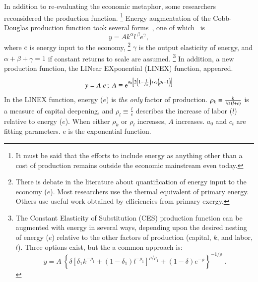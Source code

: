 In addition to re-evaluating the economic metaphor,
some researchers reconsidered the production function.%
	\footnote{
	It must be said that the efforts to include energy 
	as anything other than a cost of production 
	remains outside the economic mainstream even today.
	}
Energy augmentation of the Cobb-Douglas production function
took several forms~\cite[Equation~1]{Kavrakoglu:1983vi}, 
one of which~\cite[Equation~3.10]{Kummel:1985vz} is 
%
\begin{equation} \label{eq:cobb-douglas_with_energy}
	y = A k^{\alpha} l \, ^\beta e^{\gamma} ,
\end{equation}	 
%
where $e$ is energy input to the economy,%
	\footnote{
	There is debate in the literature about quantification of 
	energy input to the economy ($e$).
	Most researchers use the thermal equivalent 
	of primary energy.\cite{Cleveland:1984aa, Froling:2009vo, Stern:2012ey, Nel:2010fv}
	Others use useful work obtained by efficiencies from primary exergy.\cite{Ayres:2010ug}
	}
$\gamma$ is the output elasticity of energy, and 
$\alpha + \beta + \gamma = 1$ if constant returns to scale are assumed.%
	\footnote{
	The Constant Elasticity of Substitution (CES) production function
	can be augmented with energy in several ways, 
	depending upon the desired nesting of energy ($e$) relative to the other
	factors of production 
	(capital, $k$, and labor, $l$).\cite{rath1981energy, Zwaan:2002aa}
	Three options exist, but the a common approach is:
	\begin{equation*}
		y = A \: \left\{\delta \left[\delta_1 k^{-\rho_1} 
		    + (1-\delta_1)l^{-\rho_1} \right]^{\rho/\rho_1} 
		    + (1-\delta) e^{-\rho} \right\}^{-1/\rho} \; .
	\end{equation*}
	}
In addition, a new production function, 
the LINear EXponential (LINEX) function, 
appeared.\cite{Ayres:2010ug, Kummel:1980wx, Kummel:1982vy}
%
\begin{equation} \label{eq:LINEX}
  y = A \; e \, ; \; A \equiv \mathrm{e}^{a_0\left[2 \left(1 - \frac{1}{\rho_k} \right) 
    + c_t \left(\vphantom{\frac{1}{\rho_k}}\rho_l - 1 \right)\right]}
\end{equation}
%
In the LINEX function, energy ($e$) is \emph{the only} factor of production.
$\rho_k \equiv \frac{k}{\nicefrac{1}{2} \, (l+e)}$ is a measure of capital deepening,
and $\rho_l \equiv \frac{l}{e}$ describes the increase of labor ($l$)
relative to energy ($e$).
When either $\rho_k$ or $\rho_l$ increases, $A$ increases.
$a_0$ and $c_t$ are fitting parameters. 
e is the exponential function.

